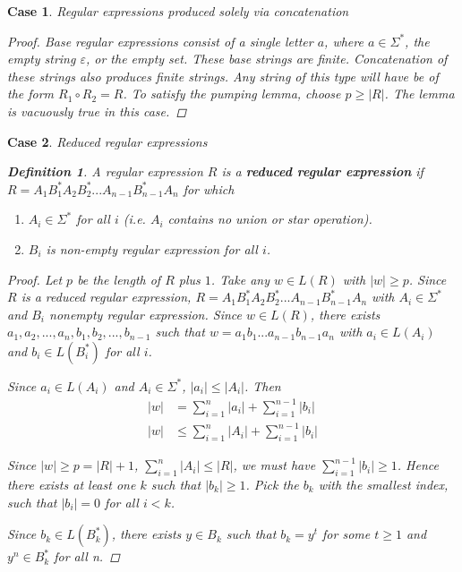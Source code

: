 \documentclass[11pt]{article}
\newtheorem{case}{Case}
\theoremstyle{definition}
\newtheorem*{definition}{Definition}
\begin{document}
\begin{case} Regular expressions produced solely via concatenation
\begin{proof}
Base regular expressions consist of a single letter $a$, where $a \in \Sigma^*$, the empty string $\varepsilon$, or the empty set. These base strings are finite. Concatenation of these strings also produces finite strings. Any string of this type will have be of the form $R_1 \circ R_2 = R$. To satisfy the pumping lemma, choose $p \ge |R|$. The lemma is vacuously true in this case.
\end{proof}
\end{case}
\begin{case}
Reduced regular expressions

\begin{definition}
A regular expression $R$ is a \textbf{reduced regular expression} if $R = A_1B_1^*A_2B_2^*...A_{n-1}B_{n-1}^*A_n$ for which
\begin{enumerate}
    \item $A_i \in \Sigma^*$ for all $i$ (i.e. $A_i$ contains no union or star operation).
    \item $B_i$ is non-empty regular expression for all $i$.
\end{enumerate}
\end{definition}
\begin{proof}
Let $p$ be the length of $R$ plus $1$. Take any $w\in L(R)$ with $|w|\geq p$. Since $R$ is a reduced regular expression, $R = A_1B_1^*A_2B_2^*...A_{n-1}B_{n-1}^*A_n$ with $A_i \in \Sigma^*$ and $B_i$ nonempty regular expression. Since $w \in L(R)$, there exists $a_1, a_2, ... ,a_n, b_1, b_2, ...,b_{n-1}$ such that $w = a_1b_1 ... a_{n-1}b_{n-1}a_n$ with $a_i \in L(A_i)$ and $b_i\in L(B_i^*)$ for all $i$.

Since $a_i \in L(A_i)$ and $A_i \in \Sigma^*$, $|a_i| \leq |A_i|$. Then 
\begin{align*}
    |w| &= \sum_{i=1}^n{|a_i|} + \sum_{i=1}^{n-1}{|b_i|}\\
    |w| &\leq \sum_{i=1}^n{|A_i|} + \sum_{i=1}^{n-1}{|b_i|}
\end{align*}

Since $|w| \geq p = |R| + 1$, $\sum_{i=1}^n{|A_i|} \leq |R|$, we must have $\sum_{i=1}^{n-1}{|b_i|} \geq 1$. Hence there exists at least one $k$ such that $|b_k| \geq 1$. Pick the $b_k$ with the smallest index, such that $|b_i| = 0$ for all $i < k$.

Since $b_k \in L(B_k^*)$, there exists $y\in B_k$ such that $b_k = y^t$ for some $t\geq 1$ and $y^n \in B_k ^*$ for all n. 


\end{proof}
\end{case}
\end{document}
